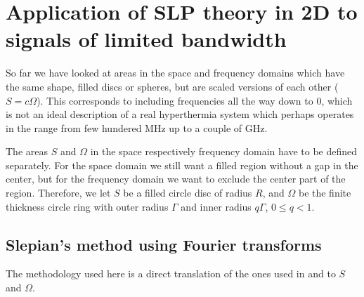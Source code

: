 \documentclass[11pt,a4paper, 
swedish,english %
]{article}
\begin{document}
\section{Application of SLP theory in 2D to signals of limited bandwidth}
So far we have looked at areas in the space and frequency domains
which have the same shape, filled discs or spheres, but are scaled
versions of each other ($S=c\Omega$). This corresponds to
including frequencies all the way down to 0, which is not an ideal
description of a real hyperthermia system which perhaps operates in the
range from few hundered MHz up to a couple of GHz.

The areas $S$ and $\Omega$ in the space respectively frequency domain have to
be defined separately.
For the space domain we still want a
filled region without a gap in the center, but for the frequency domain
we want to exclude the center part of the region.
Therefore, we let $S$ be a filled
circle disc of radius $R$, and $\Omega$ be the finite thickness circle
ring with outer radius $\Gamma$ and inner radius $q\Gamma$, $0\le q<1$.


\subsection{Slepian's method using Fourier transforms}
The methodology used here is a direct translation of the ones used in
\cite{PSWF-I_1961} and \cite{PSWF-IV_1964} to $S$ and $\Omega$.
\end{document}
